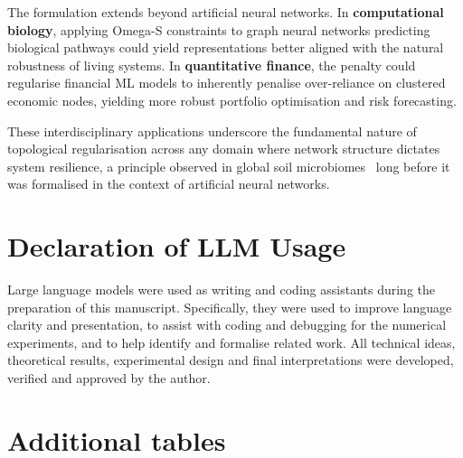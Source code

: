 \documentclass[11pt,a4paper]{article}
\begin{document}
The formulation extends beyond artificial neural networks. In
\textbf{computational biology}, applying Omega-S constraints to graph
neural networks predicting biological pathways could yield representations
better aligned with the natural robustness of living systems. In
\textbf{quantitative finance}, the penalty could regularise financial ML
models to inherently penalise over-reliance on clustered economic nodes,
yielding more robust portfolio optimisation and risk forecasting.

These interdisciplinary applications underscore the fundamental nature of
topological regularisation across any domain where network structure
dictates system resilience, a principle observed in global soil
microbiomes~\cite{ortiz2021,saati2026,biome_patent} long before it was
formalised in the context of artificial neural networks.

\section{Declaration of LLM Usage}

Large language models were used as writing and coding assistants during the
preparation of this manuscript. Specifically, they were used to improve
language clarity and presentation, to assist with coding and debugging for
the numerical experiments, and to help identify and formalise related work.
All technical ideas, theoretical results, experimental design and final
interpretations were developed, verified and approved by the author.


\section{Additional tables}
\end{document}
